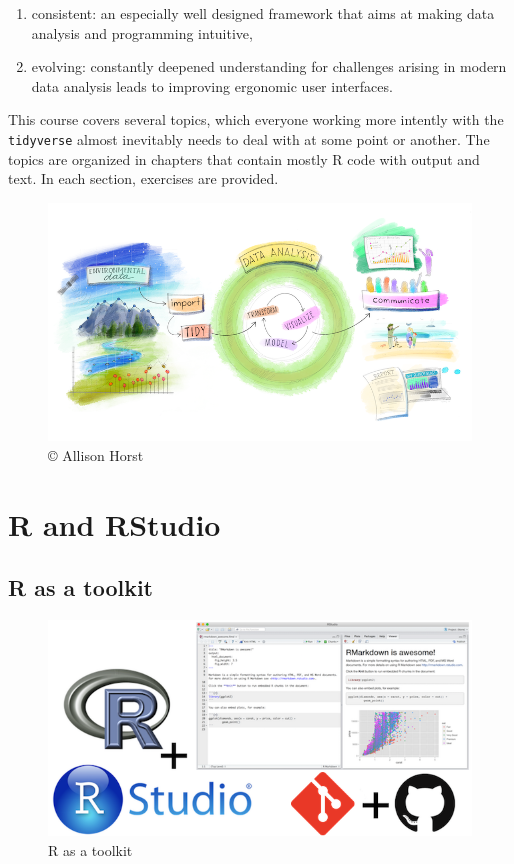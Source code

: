 \documentclass[]{book}
\providecommand{\tightlist}{%
  \setlength{\itemsep}{0pt}\setlength{\parskip}{0pt}}
\begin{document}
\begin{enumerate}
\def\labelenumi{\arabic{enumi}.}
\tightlist
\item
  consistent: an especially well designed framework that aims at making data analysis and programming intuitive,
\item
  evolving: constantly deepened understanding for challenges arising in modern data analysis leads to improving ergonomic user interfaces.
\end{enumerate}

This course covers several topics, which everyone working more intently with the \texttt{tidyverse} almost inevitably needs to deal with at some point or another.
The topics are organized in chapters that contain mostly R code with output and text.
In each section, exercises are provided.

\begin{figure}

\hfill{}\includegraphics[width=11.11in]{img/environmental-data-science-r4ds-general} 

\caption{© Allison Horst}\label{fig:r4ds}
\end{figure}

\hypertarget{r-and-rstudio}{%
\chapter{R and RStudio}\label{r-and-rstudio}}

\hypertarget{r-as-a-toolkit}{%
\section{R as a toolkit}\label{r-as-a-toolkit}}

\begin{figure}
\centering
\includegraphics{img/toolkit.png}
\caption{R as a toolkit}
\end{figure}
\end{document}
